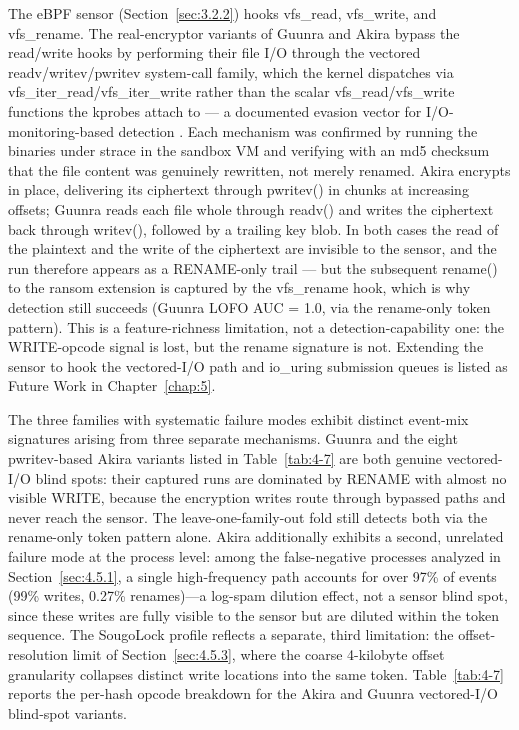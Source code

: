 The eBPF sensor (Section~\ref{sec:3.2.2}) hooks vfs\_\allowbreak{}read, vfs\_\allowbreak{}write, and vfs\_\allowbreak{}rename. The real-encryptor variants of Guunra and Akira bypass the read/\allowbreak{}write hooks by performing their file I/\allowbreak{}O through the vectored readv/\allowbreak{}writev/\allowbreak{}pwritev system-call family, which the kernel dispatches via vfs\_\allowbreak{}iter\_\allowbreak{}read/\allowbreak{}vfs\_\allowbreak{}iter\_\allowbreak{}write rather than the scalar vfs\_\allowbreak{}read/\allowbreak{}vfs\_\allowbreak{}write functions the kprobes attach to --- a documented evasion vector for I/\allowbreak{}O-monitoring-based detection \cite{ref24}. Each mechanism was confirmed by running the binaries under strace in the sandbox VM and verifying with an md5 checksum that the file content was genuinely rewritten, not merely renamed. Akira encrypts in place, delivering its ciphertext through pwritev() in chunks at increasing offsets; Guunra reads each file whole through readv() and writes the ciphertext back through writev(), followed by a trailing key blob. In both cases the read of the plaintext and the write of the ciphertext are invisible to the sensor, and the run therefore appears as a RENAME-only trail --- but the subsequent rename() to the ransom extension is captured by the vfs\_\allowbreak{}rename hook, which is why detection still succeeds (Guunra LOFO AUC = 1.0, via the rename-only token pattern). This is a feature-richness limitation, not a detection-capability one: the WRITE-opcode signal is lost, but the rename signature is not. Extending the sensor to hook the vectored-I/\allowbreak{}O path and io\_\allowbreak{}uring submission queues is listed as Future Work in Chapter~\ref{chap:5}.

The three families with systematic failure modes exhibit distinct event-mix signatures arising from three separate mechanisms. Guunra and the eight pwritev-based Akira variants listed in Table~\ref{tab:4-7} are both genuine vectored-I/\allowbreak{}O blind spots: their captured runs are dominated by RENAME with almost no visible WRITE, because the encryption writes route through bypassed paths and never reach the sensor. The leave-one-family-out fold still detects both via the rename-only token pattern alone. Akira additionally exhibits a second, unrelated failure mode at the process level: among the false-negative processes analyzed in Section~\ref{sec:4.5.1}, a single high-frequency path accounts for over 97\% of events (99\% writes, 0.27\% renames)---a log-spam dilution effect, not a sensor blind spot, since these writes are fully visible to the sensor but are diluted within the token sequence. The SougoLock profile reflects a separate, third limitation: the offset-resolution limit of Section~\ref{sec:4.5.3}, where the coarse 4-kilobyte offset granularity collapses distinct write locations into the same token. Table~\ref{tab:4-7} reports the per-hash opcode breakdown for the Akira and Guunra vectored-I/\allowbreak{}O blind-spot variants.

